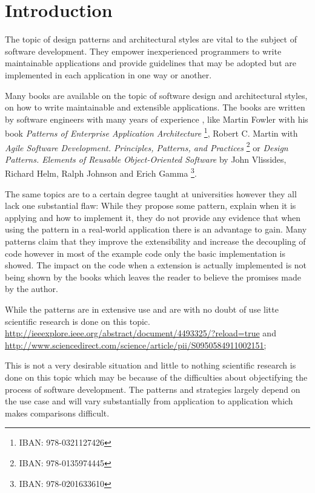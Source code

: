\chapter{Introduction}

The topic of design patterns and architectural styles are vital to the subject of software development. They empower inexperienced programmers to write maintainable applications and provide guidelines that may be adopted but are implemented in each application in one way or another. 

Many books are available on the topic of software design and architectural styles, on how to write maintainable and extensible applications. The books are written by software engineers with many years of experience , like Martin Fowler with his book \emph{Patterns of Enterprise Application Architecture} \footnote{IBAN: 978-0321127426}, Robert C. Martin with \emph{Agile Software Development. Principles, Patterns, and Practices} \footnote{IBAN: 978-0135974445} or \emph{Design Patterns. Elements of Reusable Object-Oriented Software} by John Vlissides, Richard Helm, Ralph Johnson and Erich Gamma \footnote{IBAN: 978-0201633610}. 

The same topics are to a certain degree taught at universities however they all lack one substantial flaw: While they propose some pattern, explain when it is applying and how to implement it, they do not provide any evidence that when using the pattern in a real-world application there is an advantage to gain.  Many patterns claim that they improve the extensibility and increase the decoupling of code however in most of the example code only the basic implementation is showed. The impact on the code when a extension is actually implemented is not being shown by the books which leaves the reader to believe the promises made by the author. 

While the patterns are in extensive use and are with no doubt of use litte scientific research is done on this topic. \href{http://ieeexplore.ieee.org/abstract/document/4493325/?reload=true}{http://ieeexplore.ieee.org/abstract/document/4493325/?reload=true} and \href{http://www.sciencedirect.com/science/article/pii/S0950584911002151;}{http://www.sciencedirect.com/science/article/pii/S0950584911002151;}

This is not a very desirable situation and little to nothing scientific research is done on this topic which may be because of the difficulties about objectifying the process of software development. The patterns and strategies largely depend on the use case and will vary substantially from application to application which makes comparisons difficult. 


